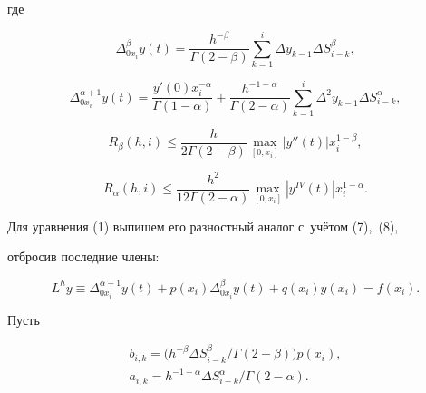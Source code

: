 где 

$$ 

\Delta^{\beta}_{0x_i} y(t)=\frac{h^{-\beta}}{\Gamma(2-\beta)} 

\sum\limits_{k=1}^i  

\Delta y_{k-1} \Delta S^\beta_{i-k}, 

$$ 

$$ 

\Delta^{\alpha+1}_{0x_i} y(t)=\frac{y'(0)x_i^{-\alpha}}{\Gamma(1-\alpha)}+ 

\frac{h^{-1-\alpha}}{\Gamma(2-\alpha)} 

\sum\limits_{k=1}^i  

\Delta^2 y_{k-1} \Delta S^\alpha_{i-k}, 

$$ 

$$ 

R_\beta(h,i)\leq \frac{h}{2\Gamma(2-\beta)} 

\max\limits_{[0,x_i]}|y''(t)|x_i^{1-\beta}, 

$$ 

$$ 

R_\alpha(h,i)\leq \frac{h^2}{12\Gamma(2-\alpha)} 

\max\limits_{[0,x_i]}|y^{IV}(t)|x_i^{1-\alpha}. 

$$ 

 

Для уравнения (1) выпишем его разностный аналог с~учётом (7),~(8), 

отбросив последние члены: 

\begin{equation} 

\label{ch9} 

L^h y\equiv \Delta^{\alpha+1}_{0x_i} y(t)+p(x_i) 

\Delta^{\beta}_{0x_i} y(t)+q(x_i)y(x_i)=f(x_i). 

\end{equation} 

 

Пусть  

\begin{gather} 

\label{ch10} 

b_{i,k}=\big(h^{-\beta}\Delta S^\beta_{i-k}/ 

\Gamma(2-\beta)\big)p(x_i),\\ 

\label{ch11} 

a_{i,k}=h^{-1-\alpha}\Delta S^\alpha_{i-k}/ 

\Gamma(2-\alpha). 

\end{gather} 

